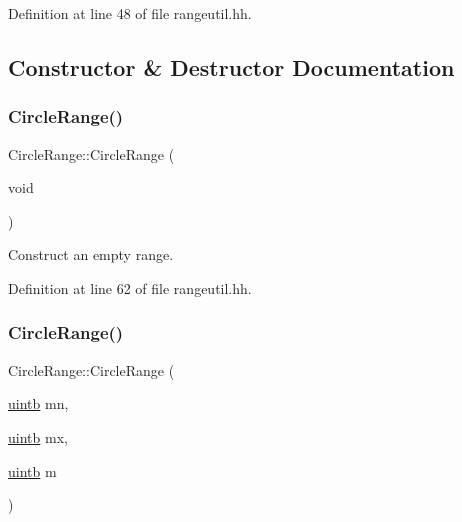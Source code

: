 Definition at line 48 of file rangeutil.\+hh.



\subsection{Constructor \& Destructor Documentation}
\mbox{\label{class_circle_range_a4771182938dbac834d9474c5603ef2e3}} 
\subsubsection{\texorpdfstring{CircleRange()}{CircleRange()}\hspace{0.1cm}{\footnotesize\ttfamily [1/4]}}
{\footnotesize\ttfamily Circle\+Range\+::\+Circle\+Range (\begin{DoxyParamCaption}\item[{void}]{ }\end{DoxyParamCaption})\hspace{0.3cm}{\ttfamily [inline]}}



Construct an empty range. 



Definition at line 62 of file rangeutil.\+hh.

\mbox{\label{class_circle_range_a103e8c9764ba08acce7a179e5b4ecff7}} 
\subsubsection{\texorpdfstring{CircleRange()}{CircleRange()}\hspace{0.1cm}{\footnotesize\ttfamily [2/4]}}
{\footnotesize\ttfamily Circle\+Range\+::\+Circle\+Range (\begin{DoxyParamCaption}\item[{\mbox{\hyperlink{types_8h_a2db313c5d32a12b01d26ac9b3bca178f}{uintb}}}]{mn,  }\item[{\mbox{\hyperlink{types_8h_a2db313c5d32a12b01d26ac9b3bca178f}{uintb}}}]{mx,  }\item[{\mbox{\hyperlink{types_8h_a2db313c5d32a12b01d26ac9b3bca178f}{uintb}}}]{m }\end{DoxyParamCaption})}



